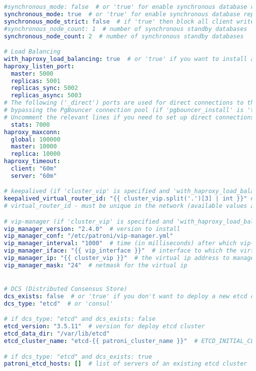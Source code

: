 \begin{flushleft}
\begin{lstlisting}[language=yaml, caption=Testsystem - Deployment - main.yml,captionpos=b,label={lst:testsystem-deployment-main.yml},breaklines=true]
#synchronous_mode: false  # or 'true' for enable synchronous database replication
synchronous_mode: true  # or 'true' for enable synchronous database replication
synchronous_mode_strict: false  # if 'true' then block all client writes to the master, when a synchronous replica is not available
#synchronous_node_count: 1  # number of synchronous standby databases
synchronous_node_count: 2  # number of synchronous standby databases

# Load Balancing
with_haproxy_load_balancing: true  # or 'true' if you want to install and configure the load-balancing
haproxy_listen_port:
  master: 5000
  replicas: 5001
  replicas_sync: 5002
  replicas_async: 5003
# The following ('_direct') ports are used for direct connections to the PostgreSQL database,
# bypassing the PgBouncer connection pool (if 'pgbouncer_install' is 'true').
# Uncomment the relevant lines if you need to set up direct connections.
  stats: 7000
haproxy_maxconn:
  global: 100000
  master: 10000
  replica: 10000
haproxy_timeout:
  client: "60m"
  server: "60m"

# keepalived (if 'cluster_vip' is specified and 'with_haproxy_load_balancing' is 'true')
keepalived_virtual_router_id: "{{ cluster_vip.split('.')[3] | int }}" # The last octet of 'cluster_vip' IP address is used by default.
# virtual_router_id - must be unique in the network (available values are 0..255).

# vip-manager (if 'cluster_vip' is specified and 'with_haproxy_load_balancing' is 'false')
vip_manager_version: "2.4.0"  # version to install
vip_manager_conf: "/etc/patroni/vip-manager.yml"
vip_manager_interval: "1000"  # time (in milliseconds) after which vip-manager wakes up and checks if it needs to register or release ip addresses.
vip_manager_iface: "{{ vip_interface }}"  # interface to which the virtual ip will be added
vip_manager_ip: "{{ cluster_vip }}"  # the virtual ip address to manage
vip_manager_mask: "24"  # netmask for the virtual ip


# DCS (Distributed Consensus Store)
dcs_exists: false  # or 'true' if you don't want to deploy a new etcd cluster
dcs_type: "etcd"  # or 'consul'

# if dcs_type: "etcd" and dcs_exists: false
etcd_version: "3.5.11"  # version for deploy etcd cluster
etcd_data_dir: "/var/lib/etcd"
etcd_cluster_name: "etcd-{{ patroni_cluster_name }}"  # ETCD_INITIAL_CLUSTER_TOKEN

# if dcs_type: "etcd" and dcs_exists: true
patroni_etcd_hosts: []  # list of servers of an existing etcd cluster


\end{lstlisting}
\end{flushleft}

